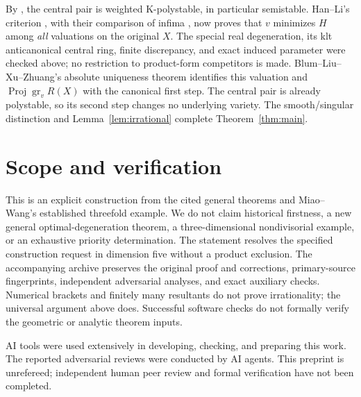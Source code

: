\documentclass[11pt,a4paper]{article}
\newcommand{\gr}{\operatorname{gr}}
\newcommand{\Proj}{\operatorname{Proj}}
\begin{document}
By \cite[Theorem~1.3]{BLXZ}, the central pair is weighted K-polystable,
in particular semistable.
Han--Li's criterion \cite[Theorem~5.3]{HL}, with their comparison
of infima \cite[Theorem~1.5]{HL}, now proves that \(v\) minimizes
\(H\) among \emph{all} valuations on the original \(X\).
The special real degeneration, its klt anticanonical central ring,
finite discrepancy, and exact induced parameter were checked above;
no restriction to product-form competitors is made.
Blum--Liu--Xu--Zhuang's absolute uniqueness theorem
\cite[Theorem~1.2]{BLXZ} identifies this valuation and
\(\Proj\gr_vR(X)\) with the canonical first step.
The central pair is already polystable, so its second step changes
no underlying variety. The smooth/singular distinction and
Lemma~\ref{lem:irrational} complete Theorem~\ref{thm:main}.

\section{Scope and verification}

This is an explicit construction from the cited general theorems and
Miao--Wang's established threefold example. We do not claim historical
firstness, a new general optimal-degeneration theorem, a
three-dimensional nondivisorial example, or an exhaustive priority
determination. The statement resolves the specified construction
request in dimension five without a product exclusion.
The accompanying archive preserves the original proof and corrections,
primary-source fingerprints, independent adversarial analyses, and
exact auxiliary checks. Numerical brackets and finitely many
resultants do not prove irrationality; the universal argument above does.
Successful software checks do not formally verify the geometric or
analytic theorem inputs.

AI tools were used extensively in developing, checking, and preparing this
work. The reported adversarial reviews were conducted by AI agents.
This preprint is unrefereed; independent human peer review and formal
verification have not been completed.
\end{document}
